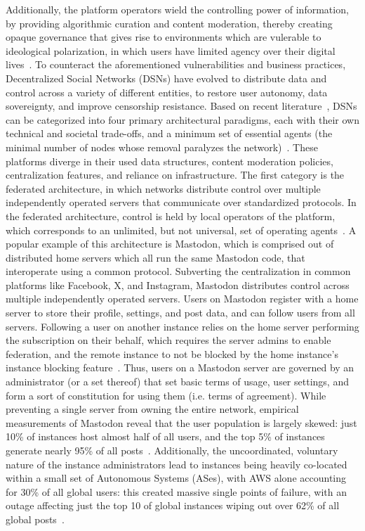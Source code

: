Additionally, the platform operators wield the controlling power of information, by providing algorithmic curation and content moderation, thereby creating opaque governance that gives rise to environments which are vulerable to ideological polarization, in which users have limited agency over their digital lives~\cite{Balduf2024,Jeong2025}.
To counteract the aforementioned vulnerabilities and business practices, Decentralized Social Networks (DSNs) have evolved to distribute data and control across a variety of different entities, to restore user autonomy, data sovereignty, and improve censorship resistance. Based on recent literature~\cite{Jeong2025}, DSNs can be categorized into four primary architectural paradigms, each with their own technical and societal trade-offs, and a minimum set of essential agents (the minimal number of nodes whose removal paralyzes the network)~\cite{Shapiro2026Platforms}. These platforms diverge in their used data structures, content moderation policies, centralization features, and reliance on infrastructure.
The first category is the federated architecture, in which networks distribute control over multiple independently operated servers that communicate over standardized protocols.
In the federated architecture, control is held by local operators of the platform, which corresponds to an unlimited, but not universal, set of operating agents~\cite{Shapiro2026Platforms}.
A popular example of this architecture is Mastodon, which is comprised out of distributed home servers which all run the same Mastodon code, that interoperate using a common protocol. %
Subverting the centralization in common platforms like Facebook, X, and Instagram, Mastodon distributes control across multiple independently operated servers.
Users on Mastodon register with a home server to store their profile, settings, and post data, and can follow users from all servers. Following a user on another instance relies on the home server performing the subscription on their behalf, which requires the server admins to enable federation, and the remote instance to not be blocked by the home instance's instance blocking feature~\cite{Aravindh2019}.
Thus, users on a Mastodon server are governed by an administrator (or a set thereof) that set basic terms of usage, user settings, and form a sort of constitution for using them (i.e. terms of agreement).
While preventing a single server from owning the entire network, empirical measurements of Mastodon reveal that the user population is largely skewed: just 10\% of instances host almost half of all users, and the top 5\% of instances generate nearly 95\% of all posts~\cite{Aravindh2019}. Additionally, the uncoordinated, voluntary nature of the instance administrators lead to instances being heavily co-located within a small set of Autonomous Systems (ASes), with AWS alone accounting for 30\% of all global users: this created massive single points of failure, with an outage affecting just the top 10 of global instances wiping out over 62\% of all global posts~\cite{Aravindh2019}.

